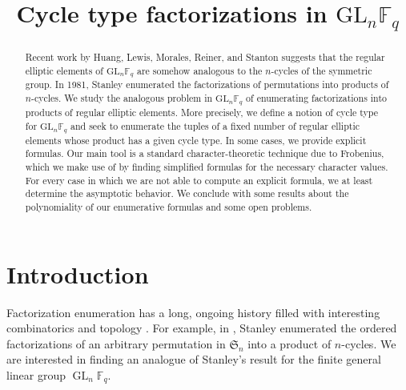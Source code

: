 \documentclass[Unicode,ALCO]{cedram}
\title{Cycle type factorizations in \(\mathrm{GL}_n \mathbb{F}_q\)}
\author[\initial{G.} Gordon]{\firstname{Graham} \lastname{Gordon}}
\DeclareMathOperator{\GL}{GL}
\newcommand{\F}{\mathbb{F}}
\newcommand{\FS}{\mathfrak{S}}
\begin{document}
\newtheorem{problem}[cdrthm]{Problem}

\begin{abstract}
	Recent work by Huang, Lewis, Morales, Reiner, and Stanton suggests that the regular elliptic elements of \(\mathrm{GL}_n \mathbb{F}_q\) are somehow analogous to the \(n\)-cycles of the symmetric group.
	In 1981, Stanley enumerated the factorizations of permutations into products of \(n\)-cycles.
	We study the analogous problem in \(\mathrm{GL}_n \mathbb{F}_q\) of enumerating factorizations into products of regular elliptic elements.
	More precisely, we define a notion of cycle type for \(\mathrm{GL}_n \mathbb{F}_q\) and seek to enumerate the tuples of a fixed number of regular elliptic elements whose product has a given cycle type.
	In some cases, we provide explicit formulas.
	Our main tool is a standard character-theoretic technique due to Frobenius, which we make use of by finding simplified formulas for the necessary character values.
	For every case in which we are not able to compute an explicit formula, we at least determine the asymptotic behavior.
	We conclude with some results about the polynomiality of our enumerative formulas and some open problems.
\end{abstract}
	
\maketitle

\section{Introduction}


Factorization enumeration has a long, ongoing history filled with interesting combinatorics and topology \cite{bona_pittel, chapuy_stump, denes, elsv, cacti, jackson_top, vakil}.
For example, in \cite{ncycle}, Stanley enumerated the ordered factorizations of an arbitrary permutation in \(\FS_n\) into a product of \(n\)-cycles.
We are interested in finding an analogue of Stanley's result for the finite general linear group \(\GL_n \F_q\).
\end{document}
